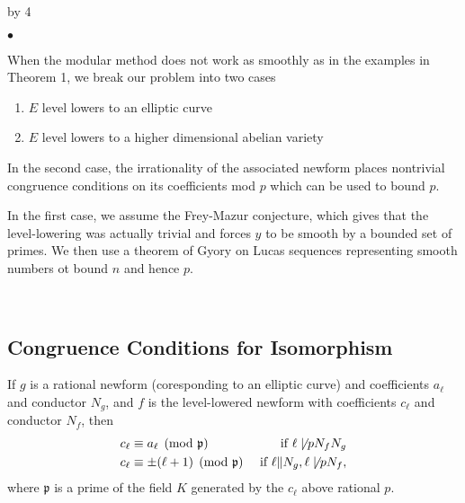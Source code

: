 \documentclass[12pt]{scrartcl}
\newenvironment{citemize}{
\begin{list}{$\bullet$}{\setlength{\itemsep}{0pt} \setlength{\rightmargin}{0pt} \setlength{\leftmargin}{0.5\labelwidth} \setlength{\topsep}{0pt}}
}{\end{list}}
\newcommand{\p}{\mathfrak{p}}
\def\anzspalten{4}
\newlength{\kastenwidth}
\newenvironment{kasten}{%
  \begin{lrbox}{\dummybox}%
    \begin{minipage}{0.96\linewidth}}%
    {\end{minipage}%
  \end{lrbox}%
  \raisebox{-\depth}{\psshadowbox[framesep=1em]{\usebox{\dummybox}}}\\[0.5em]}
\newenvironment{spalte}{%
  \setlength\kastenwidth{1.2\textwidth}
  \divide\kastenwidth by \anzspalten
  \begin{minipage}[t]{\kastenwidth}}{\end{minipage}\hfill}
\begin{document}
\begin{lrbox}{\spalten}
{\begin{spalte}
\begin{kasten}
\begin{citemize}
\item When the modular method does not work as smoothly as in the examples in Theorem 1, we break our problem into two cases
\begin{enumerate}

\item $E$ level lowers to an elliptic curve

\item $E$ level lowers to a higher dimensional abelian variety

\end{enumerate}

\item In the second case, the irrationality of the associated newform places nontrivial congruence conditions on its coefficients mod $p$ which can be used to bound $p$.

\item In the first case, we assume the Frey-Mazur conjecture, which gives that the level-lowering was actually trivial and forces $y$ to be smooth by a bounded set of primes.  We then use a theorem of Gyory on Lucas sequences representing smooth numbers ot bound $n$ and hence $p$.

\end{citemize}

\end{kasten}

\begin{kasten}

\subsection*{ \color{blue} Congruence Conditions for Isomorphism}

If $g$ is a rational newform (coresponding to an elliptic curve) and coefficients $a_\ell$ and conductor $N_g$, and $f$ is the level-lowered newform with coefficients $c_\ell$ and conductor $N_f$, then
\begin{align*}
c_\ell &\equiv a_\ell \pmod{\p} & \text{ if $\ell \not\mid pN_fN_g$} \\
c_\ell &\equiv \pm(\ell+1) \pmod{\p} & \text{ if $\ell \| N_g, \ell \not\mid pN_f$},
\end{align*}
where $\p$ is a prime of the field $K$ generated by the $c_\ell$ above rational $p$. \\


\end{kasten}
\end{spalte}}
\end{lrbox}
\end{document}
